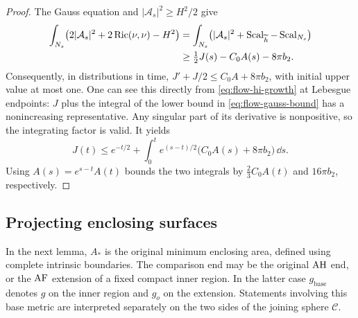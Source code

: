 \begin{proof}
The Gauss equation and $|\mathcal A_s|^2\ge H^2/2$ give
\begin{align}\label{eq:flow-gauss-bound}
 \int_{N_s}\bigl(2|\mathcal A_s|^2+2\operatorname{Ric}(\nu,\nu)-H^2\bigr)
 &=\int_{N_s}\bigl(|\mathcal A_s|^2+
                   \operatorname{Scal}_{\widetilde h}-\operatorname{Scal}_{N_s}\bigr)\notag\\
 &\ge\tfrac12J(s)-C_0A(s)-8\pi b_2.
\end{align}
Consequently, in distributions in time,
$J'+J/2\le C_0A+8\pi b_2$, with initial upper value at most one.
One can see this directly from \eqref{eq:flow-hi-growth} at Lebesgue
endpoints: $J$ plus the integral of the lower bound in
\eqref{eq:flow-gauss-bound} has a nonincreasing representative.  Any
singular part of its derivative is nonpositive, so the integrating
factor is valid.  It yields
\begin{equation}\label{eq:flow-integrated-curvature}
 J(t)\le e^{-t/2}
       +\int_0^t e^{(s-t)/2}\bigl(C_0A(s)+8\pi b_2\bigr)\,\dd s.
\end{equation}
Using $A(s)=e^{s-t}A(t)$ bounds the two integrals by
$\frac23C_0A(t)$ and $16\pi b_2$, respectively.
\end{proof}

\subsection{Projecting enclosing surfaces}

In the next lemma, $A_*$ is the original minimum enclosing area,
defined using complete intrinsic boundaries.  The comparison end may
be the original $\mathrm{AH}$ end, or the $\mathrm{AF}$ extension of a fixed compact
inner region.  In the latter case $g_{\mathrm{base}}$ denotes $g$ on
the inner region and $g_o$ on the extension.  Statements involving
this base metric are interpreted separately on the two sides of the
joining sphere $\mathcal C$.

